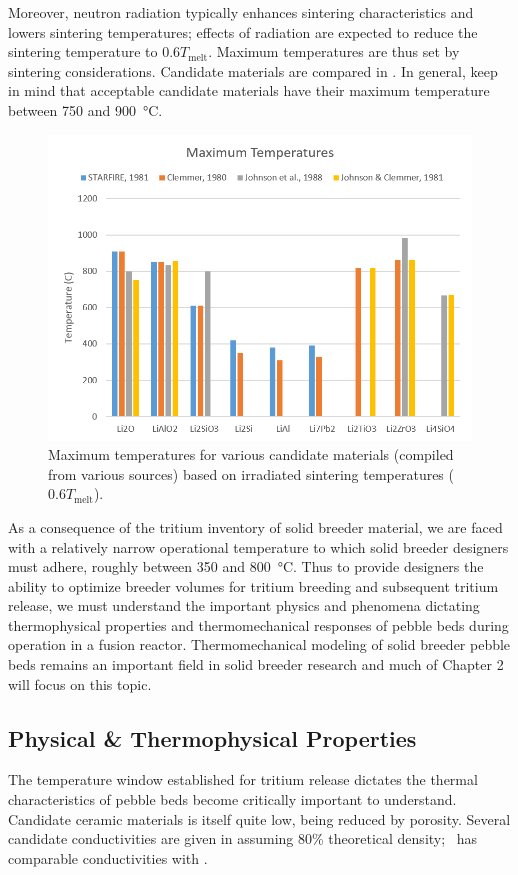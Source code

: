 \documentclass[11pt]{report} %
\newcommand{\lit}{\ce{Li2TiO3}}
\newcommand{\lis}{\ce{Li4SiO4}}
\begin{document}
Moreover, neutron radiation typically enhances sintering characteristics and lowers sintering temperatures; effects of radiation are expected to reduce the sintering temperature to $0.6 T_\text{melt}$.\cite{Johnson1981} Maximum temperatures are thus set by sintering considerations. Candidate materials are compared in . In general, keep in mind that acceptable candidate materials have their maximum temperature between 750 and \SI{900}{\celsius}. 

\begin{figure}[ht]
	\centering
	\includegraphics[width=\textwidth]{images/Tmax} 
	\caption{Maximum temperatures for various candidate materials (compiled from various sources) based on irradiated sintering temperatures ($0.6T_\text{melt}$).}
	\label{fig:Tmax}
\end{figure}

As a consequence of the tritium inventory of solid breeder material, we are faced with a relatively narrow operational temperature to which solid breeder designers must adhere, roughly between 350 and \SI{800}{\celsius}. Thus to provide designers the ability to optimize breeder volumes for tritium breeding and subsequent tritium release, we must understand the important physics and phenomena dictating thermophysical properties and thermomechanical responses of pebble beds during operation in a fusion reactor. Thermomechanical modeling of solid breeder pebble beds remains an important field in solid breeder research and much of Chapter 2 will focus on this topic.


\FloatBarrier
\subsection{Physical \& Thermophysical Properties}
The temperature window established for tritium release dictates the thermal characteristics of pebble beds become critically important to understand. Candidate ceramic materials is itself quite low, being reduced by porosity. Several candidate conductivities are given in  assuming 80\% theoretical density; \lit~has comparable conductivities with \lis.
\end{document}

